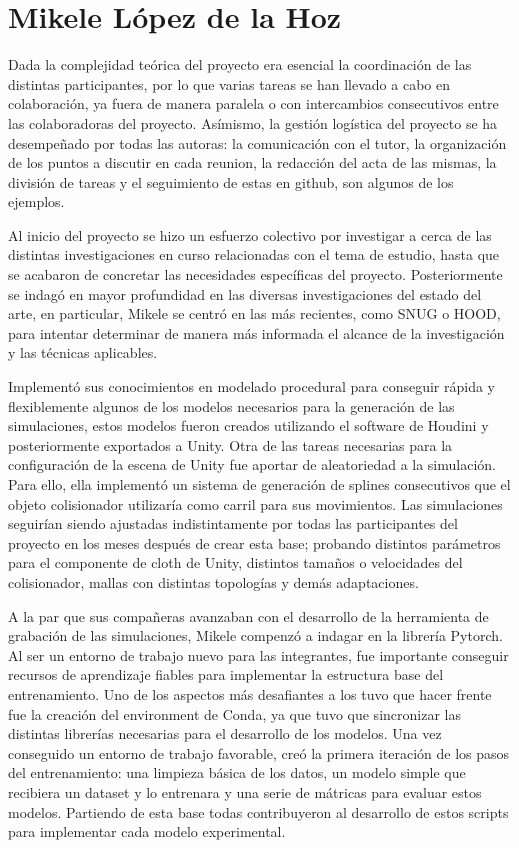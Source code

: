 \newpage
\section*{Mikele López de la Hoz}
Dada la complejidad teórica del proyecto era esencial la coordinación de las distintas participantes, por lo que varias tareas se han llevado a cabo en colaboración, ya fuera de manera paralela o con intercambios consecutivos entre las colaboradoras del proyecto. Asímismo, la gestión logística del proyecto se ha desempeñado por todas las autoras: la comunicación con el tutor, la organización de los puntos a discutir en cada reunion, la redacción del acta de las mismas, la división de tareas y el seguimiento de estas en github, son algunos de los ejemplos. \newline

Al inicio del proyecto se hizo un esfuerzo colectivo por investigar a cerca de las distintas investigaciones en curso relacionadas con el tema de estudio, hasta que se acabaron de concretar las necesidades específicas del proyecto. Posteriormente se indagó en mayor profundidad en las diversas investigaciones del estado del arte, en particular, Mikele se centró en las más recientes, como SNUG o HOOD, para intentar determinar de manera más informada el alcance de la investigación y las técnicas aplicables. \newline

Implementó sus conocimientos en modelado procedural para conseguir rápida y flexiblemente algunos de los modelos necesarios para la generación de las simulaciones, estos modelos fueron creados utilizando el software de Houdini y posteriormente exportados a Unity. Otra de las tareas necesarias para la configuración de la escena de Unity fue aportar de aleatoriedad a la simulación. Para ello, ella implementó un sistema de generación de splines consecutivos que el objeto colisionador utilizaría como carril para sus movimientos. Las simulaciones seguirían siendo ajustadas indistintamente por todas las participantes del proyecto en los meses después de crear esta base; probando distintos parámetros para el componente de cloth de Unity, distintos tamaños o velocidades del colisionador, mallas con distintas topologías y demás adaptaciones.  \newline

A la par que sus compañeras avanzaban con el desarrollo de la herramienta de grabación de las simulaciones, Mikele compenzó a indagar en la librería Pytorch. Al ser un entorno de trabajo nuevo para las integrantes, fue importante conseguir recursos de aprendizaje fiables para implementar la estructura base del entrenamiento. Uno de los aspectos más desafiantes a los tuvo que hacer frente fue la creación del environment de Conda, ya que tuvo que sincronizar las distintas librerías necesarias para el desarrollo de los modelos. Una vez conseguido un entorno de trabajo favorable, creó la primera iteración de los pasos del entrenamiento: una limpieza básica de los datos, un modelo simple que recibiera un dataset y lo entrenara y una serie de mátricas para evaluar estos modelos. Partiendo de esta base todas contribuyeron al desarrollo de estos scripts para implementar cada modelo experimental. \newline

